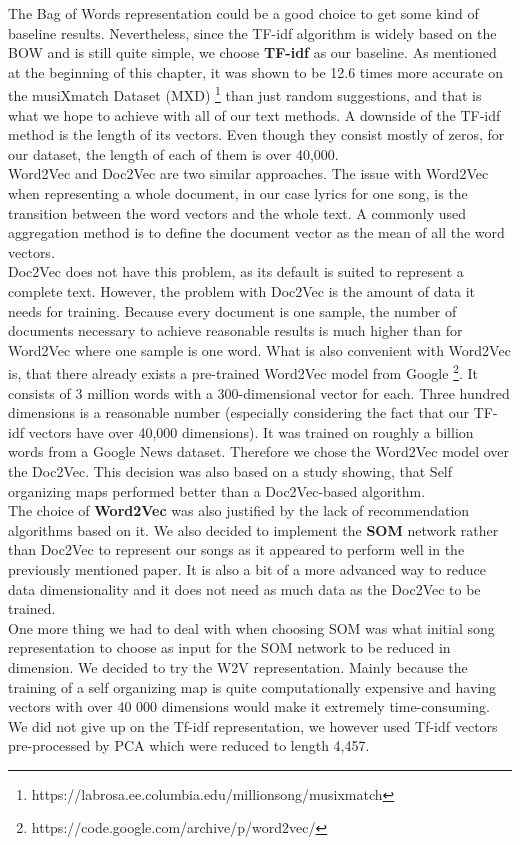 The Bag of Words representation could be a good choice to get some kind of baseline results. Nevertheless, since the TF-idf algorithm is widely based on the BOW and is still quite simple, we choose \textbf{TF-idf} as our baseline. As mentioned at the beginning of this chapter, it was shown to be 12.6 times more accurate on the musiXmatch Dataset (MXD) \footnote{https://labrosa.ee.columbia.edu/millionsong/musixmatch} than just random suggestions, and that is what we hope to achieve with all of our text methods. A downside of the TF-idf method is the length of its vectors. Even though they consist mostly of zeros, for our dataset, the length of each of them is over 40,000. \\
Word2Vec and Doc2Vec are two similar approaches. The issue with Word2Vec when representing a whole document, in our case lyrics for one song, is the transition between the word vectors and the whole text. A commonly used aggregation method is to define the document vector as the mean of all the word vectors. \\ 
Doc2Vec does not have this problem, as its default is suited to represent a complete text. However, the problem with Doc2Vec is the amount of data it needs for training. Because every document is one sample, the number of documents necessary to achieve reasonable results is much higher than for Word2Vec where one sample is one word. What is also convenient with Word2Vec is, that there already exists a pre-trained Word2Vec model from Google \footnote{https://code.google.com/archive/p/word2vec/}. It consists of 3 million words with a 300-dimensional vector for each. Three hundred dimensions is a reasonable number (especially considering the fact that our TF-idf vectors have over 40,000 dimensions). It was trained on roughly a billion words from a Google News dataset. Therefore we chose the Word2Vec model over the Doc2Vec. This decision was also based on a study \cite{inproceedings} showing, that Self organizing maps performed better than a Doc2Vec-based algorithm. \\
The choice of \textbf{Word2Vec} was also justified by the lack of recommendation algorithms based on it. We also decided to implement the \textbf{SOM} network rather than Doc2Vec to represent our songs as it appeared to perform well in the previously mentioned paper. It is also a bit of a more advanced way to reduce data dimensionality and it does not need as much data as the Doc2Vec to be trained. \\
One more thing we had to deal with when choosing SOM was what initial song representation to choose as input for the SOM network to be reduced in dimension. We decided to try the W2V representation. Mainly because the training of a self organizing map is quite computationally expensive and having vectors with over 40 000 dimensions would make it extremely time-consuming. We did not give up on the Tf-idf representation, we however used Tf-idf vectors pre-processed by PCA which were reduced to length 4,457. 
